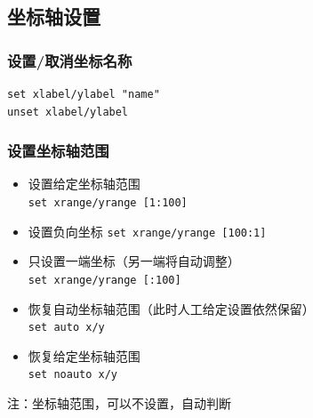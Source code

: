 \documentclass[lang=cn,10pt,newtx]{elegantbook}
\begin{document}
\subsection{坐标轴设置}
\subsubsection{设置/取消坐标名称}
 \begin{verbatim}
set xlabel/ylabel "name"
unset xlabel/ylabel
\end{verbatim}


\subsubsection{设置坐标轴范围}
\begin{itemize}
\item 设置给定坐标轴范围\\
\verb|set xrange/yrange [1:100]|

\item 设置负向坐标
\verb|set xrange/yrange [100:1]|

\item 只设置一端坐标（另一端将自动调整）\\
\verb|set xrange/yrange [:100]|

\item 恢复自动坐标轴范围（此时人工给定设置依然保留）\\
\verb|set auto x/y|

\item  恢复给定坐标轴范围\\
\verb|set noauto x/y|
\end{itemize}

注：坐标轴范围，可以不设置，自动判断
\end{document}
